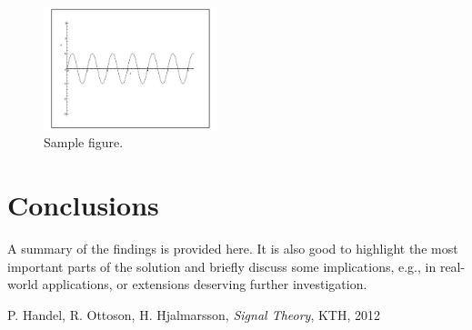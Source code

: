 \documentclass[onecolumn, 12pt]{IEEEtran}
\begin{document}
\begin{figure}[b]
\begin{center}
\includegraphics[trim=1.8cm 5.1cm 2.8cm 4.9cm, clip=true, totalheight=0.2\textheight,width=0.45\textwidth]{Sinusoid.pdf}
\end{center}
\vspace{-0.4cm}
\caption {Sample figure.}
\label{fig:Fig1}
\end{figure}

\section{Conclusions}
A summary of the findings is provided here. It is also good to highlight the most important 
parts of the solution and briefly discuss some implications, e.g., in real-world applications,
or extensions deserving further investigation.

\begin{thebibliography}{1}

P. Handel, R. Ottoson, H. Hjalmarsson, \emph{Signal Theory}, KTH, 2012

\end{thebibliography}
\end{document}
